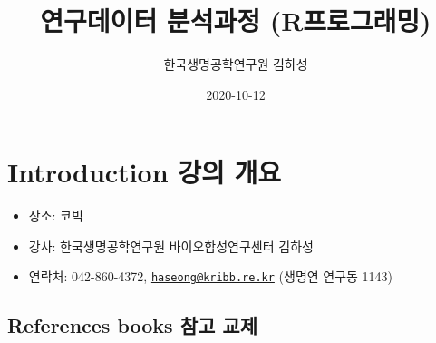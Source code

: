 \documentclass[
]{book}
\title{연구데이터 분석과정 (R프로그래밍)}
\author{한국생명공학연구원 김하성}
\date{2020-10-12}
\providecommand{\tightlist}{%
  \setlength{\itemsep}{0pt}\setlength{\parskip}{0pt}}
\begin{document}
\maketitle

{
\setcounter{tocdepth}{1}
\tableofcontents
}
\hypertarget{introduction-uxac15uxc758-uxac1cuxc694}{%
\chapter{Introduction 강의 개요}\label{introduction-uxac15uxc758-uxac1cuxc694}}

\begin{itemize}
\tightlist
\item
  장소: 코빅
\item
  강사: 한국생명공학연구원 바이오합성연구센터 김하성
\item
  연락처: 042-860-4372, \href{mailto:haseong@kribb.re.kr}{\nolinkurl{haseong@kribb.re.kr}} (생명연 연구동 1143)
\end{itemize}

\hypertarget{references-books-uxcc38uxace0-uxad50uxc81c}{%
\section{References books 참고 교제}\label{references-books-uxcc38uxace0-uxad50uxc81c}}
\end{document}
